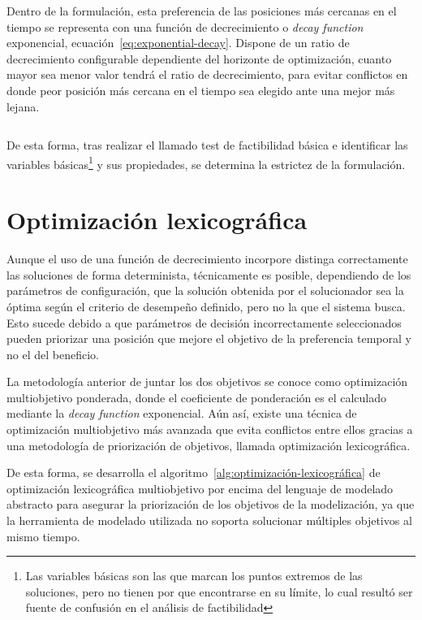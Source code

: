 Dentro de la formulación, esta preferencia de las posiciones más cercanas en el tiempo se representa con una función de decrecimiento o \textit{decay function} exponencial, ecuación~\ref{eq:exponential-decay}. Dispone de un ratio de decrecimiento configurable dependiente del horizonte de optimización, cuanto mayor sea menor valor tendrá el ratio de decrecimiento, para evitar conflictos en donde peor posición más cercana en el tiempo sea elegido ante una mejor más lejana.

\begin{equation}
  \label{eq:exponential-decay}
\end{equation}

De esta forma, tras realizar el llamado test de factibilidad básica e identificar las variables básicas\footnote{Las variables básicas son las que marcan los puntos extremos de las soluciones, pero no tienen por que encontrarse en su límite, lo cual resultó ser fuente de confusión en el análisis de factibilidad} y sus propiedades, se determina la estrictez de la formulación.

\section{Optimización lexicográfica}
\label{makereference5.4.1}

Aunque el uso de una función de decrecimiento incorpore distinga correctamente las soluciones de forma determinista, técnicamente es posible, dependiendo de los parámetros de configuración, que la solución obtenida por el solucionador sea la óptima según el criterio de desempeño definido, pero no la que el sistema busca. Esto sucede debido a que parámetros de decisión incorrectamente seleccionados pueden priorizar una posición que mejore el objetivo de la preferencia temporal y no el del beneficio.

La metodología anterior de juntar los dos objetivos se conoce como optimización multiobjetivo ponderada, donde el coeficiente de ponderación es el calculado mediante la \textit{decay function} exponencial. Aún así, existe una técnica de optimización multiobjetivo más avanzada que evita conflictos entre ellos gracias a una metodología de priorización de objetivos, llamada optimización lexicográfica.

De esta forma, se desarrolla el algoritmo~\ref{alg:optimización-lexicográfica} de optimización lexicográfica multiobjetivo por encima del lenguaje de modelado abstracto para asegurar la priorización de los objetivos de la modelización, ya que la herramienta de modelado utilizada no soporta solucionar múltiples objetivos al mismo tiempo.

